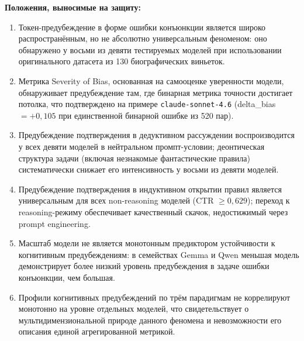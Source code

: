 \textbf{Положения, выносимые на защиту:}
\begin{enumerate}
  \item Токен-предубеждение в форме ошибки конъюнкции является широко распространённым, но не абсолютно универсальным феноменом: оно обнаружено у восьми из девяти тестируемых моделей при использовании оригинального датасета из 130 биографических виньеток.
  \item Метрика Severity of Bias, основанная на самооценке уверенности модели, обнаруживает предубеждение там, где бинарная метрика точности достигает потолка, что подтверждено на примере \texttt{claude-sonnet-4.6} (delta\_bias $= +0{,}105$ при единственной бинарной ошибке из 520 пар).
  \item Предубеждение подтверждения в дедуктивном рассуждении воспроизводится у всех девяти моделей в нейтральном промпт-условии; деонтическая структура задачи (включая незнакомые фантастические правила) систематически снижает его интенсивность у восьми из девяти моделей.
  \item Предубеждение подтверждения в индуктивном открытии правил является универсальным для всех non-reasoning моделей (CTR $\geq 0{,}629$); переход к reasoning-режиму обеспечивает качественный скачок, недостижимый через prompt engineering.
  \item Масштаб модели не является монотонным предиктором устойчивости к когнитивным предубеждениям: в семействах Gemma и Qwen меньшая модель демонстрирует более низкий уровень предубеждения в задаче ошибки конъюнкции, чем большая.
  \item Профили когнитивных предубеждений по трём парадигмам не коррелируют монотонно на уровне отдельных моделей, что свидетельствует о мультидимензиональной природе данного феномена и невозможности его описания единой агрегированной метрикой.
\end{enumerate}
